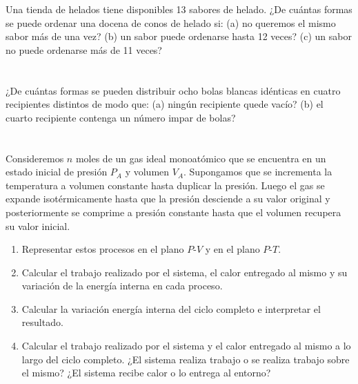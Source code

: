 \documentclass[a4paper,11pt]{article}
\begin{document}
Una tienda de helados tiene disponibles 13 sabores de helado. ¿De cuántas formas se
puede ordenar una docena de conos de helado si:
(a) no queremos el mismo sabor más de una vez?
(b) un sabor puede ordenarse hasta 12 veces?
(c) un sabor no puede ordenarse más de 11 veces?


\section{}

¿De cuántas formas se pueden distribuir ocho bolas blancas idénticas en cuatro
recipientes distintos de modo que:
(a) ningún recipiente quede vacío?
(b) el cuarto recipiente contenga un número impar de bolas?


\section{}

Consideremos $n$ moles de un gas ideal monoatómico que se encuentra en
un estado inicial de presión $P_A$ y volumen $V_A$. Supongamos que se
incrementa la temperatura a volumen constante hasta duplicar la
presión. Luego el gas se expande isotérmicamente hasta que la presión
desciende a su valor original y posteriormente se comprime a presión
constante hasta que el volumen recupera su valor inicial.

\begin{enumerate}[label=(\alph*),
                  leftmargin=2\parindent,
                  rightmargin=2\parindent]

    \item{Representar estos procesos en el plano $P$-$V$ y en el plano
          $P$-$T$.}

    \item{Calcular el trabajo realizado por el sistema, el calor
          entregado al mismo y su variación de la energía interna en
          cada proceso.}

    \item{Calcular la variación energía interna del ciclo completo e
          interpretar el resultado.}

    \item{Calcular el trabajo realizado por el sistema y el calor
          entregado al mismo a lo largo del ciclo completo. ¿El sistema
          realiza trabajo o se realiza trabajo sobre el mismo? ¿El
          sistema recibe calor o lo entrega al entorno?}

\end{enumerate}
\end{document}
